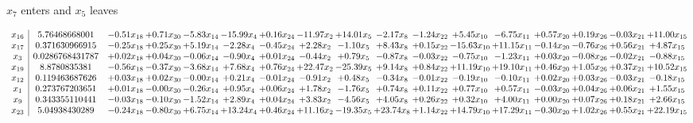 \documentclass[9pt]{article}
\begin{document}
 $ x_{7} $ enters and $ x_{5} $ leaves 

 \[\begin{array}{c| c c@{\hskip 2pt} c@{\hskip 2pt} c@{\hskip 2pt} c@{\hskip 2pt} c@{\hskip 2pt} c@{\hskip 2pt} c@{\hskip 2pt} c@{\hskip 2pt} c@{\hskip 2pt} c@{\hskip 2pt} c@{\hskip 2pt} c@{\hskip 2pt} c@{\hskip 2pt} c@{\hskip 2pt} c@{\hskip 2pt} }
 x_{16}   &  5.76468668001 & -0.51 x_{18} & +  0.71 x_{30} & -5.83 x_{14} & -15.99 x_{4} & +  0.16 x_{24} & -11.97 x_{2} & + 14.01 x_{5} & -2.17 x_{8} & -1.24 x_{22} & +  5.45 x_{10} & -6.75 x_{11} & +  0.57 x_{20} & +  0.19 x_{26} & -0.03 x_{21} & + 11.00 x_{15}\\
 x_{17}   &  0.371630966915 & -0.25 x_{18} & +  0.25 x_{30} & +  5.19 x_{14} & -2.28 x_{4} & -0.45 x_{24} & +  2.28 x_{2} & -1.10 x_{5} & +  8.43 x_{8} & +  0.15 x_{22} & -15.63 x_{10} & + 11.15 x_{11} & -0.14 x_{20} & -0.76 x_{26} & +  0.56 x_{21} & +  4.87 x_{15}\\
 x_{3}   &  0.0286768431787 & +  0.02 x_{18} & +  0.04 x_{30} & -0.06 x_{14} & -0.90 x_{4} & +  0.01 x_{24} & -0.44 x_{2} & +  0.79 x_{5} & -0.87 x_{8} & -0.03 x_{22} & -0.75 x_{10} & -1.23 x_{11} & +  0.03 x_{20} & -0.08 x_{26} & -0.02 x_{21} & -0.88 x_{15}\\
 x_{19}   &  8.8780835381 & -0.56 x_{18} & -0.37 x_{30} & -3.68 x_{14} & +  7.68 x_{4} & +  0.76 x_{24} & + 22.47 x_{2} & -25.39 x_{5} & +  9.14 x_{8} & +  0.84 x_{22} & + 11.19 x_{10} & + 19.10 x_{11} & +  0.46 x_{20} & +  1.05 x_{26} & +  0.37 x_{21} & + 10.52 x_{15}\\
 x_{12}   &  0.119463687626 & +  0.03 x_{18} & +  0.02 x_{30} & -0.00 x_{14} & +  0.21 x_{4} & -0.01 x_{24} & -0.91 x_{2} & +  0.48 x_{5} & -0.34 x_{8} & -0.01 x_{22} & -0.19 x_{10} & -0.10 x_{11} & +  0.02 x_{20} & +  0.03 x_{26} & -0.03 x_{21} & -0.18 x_{15}\\
 x_{1}   &  0.273767203651 & +  0.01 x_{18} & -0.00 x_{30} & -0.26 x_{14} & +  0.95 x_{4} & +  0.06 x_{24} & +  1.78 x_{2} & -1.76 x_{5} & +  0.74 x_{8} & +  0.11 x_{22} & +  0.77 x_{10} & +  0.57 x_{11} & -0.03 x_{20} & +  0.04 x_{26} & +  0.06 x_{21} & +  1.55 x_{15}\\
 x_{9}   &  0.343355110441 & -0.03 x_{18} & -0.10 x_{30} & -1.52 x_{14} & +  2.89 x_{4} & +  0.04 x_{24} & +  3.83 x_{2} & -4.56 x_{5} & +  4.05 x_{8} & +  0.26 x_{22} & +  0.32 x_{10} & +  4.00 x_{11} & +  0.00 x_{20} & +  0.07 x_{26} & +  0.18 x_{21} & +  2.66 x_{15}\\
 x_{23}   &  5.04938430289 & -0.24 x_{18} & -0.80 x_{30} & +  6.75 x_{14} & + 13.24 x_{4} & +  0.46 x_{24} & + 11.16 x_{2} & -19.35 x_{5} & + 23.74 x_{8} & +  1.14 x_{22} & + 14.79 x_{10} & + 17.29 x_{11} & -0.30 x_{20} & +  1.02 x_{26} & +  0.55 x_{21} & + 22.19 x_{15}\\

\end{array}\]
\end{document}
